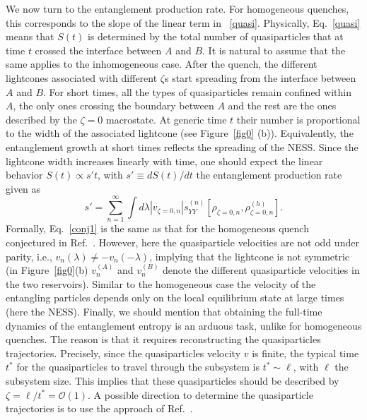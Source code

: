 \documentclass[twocolumn,superscriptaddress,prb,10pt]{revtex4-1}
\begin{document}
We now turn to the entanglement production rate. For homogeneous quenches, this corresponds to the 
slope of the linear term in ~\eqref{quasi}. Physically, Eq.~\eqref{quasi} means that $S(t)$ is determined by 
the total number of quasiparticles that at time $t$ crossed the interface between $A$ and $B$. 
It is natural to assume that the same applies  to the inhomogeneous case. 
After the quench, the different lightcones associated with different $\zeta$s  
start spreading from the interface between $A$ and $B$. For short times, all the 
types of quasiparticles remain confined within $A$, the only ones crossing the 
boundary between $A$ and the rest are the ones described by the $\zeta=0$ macrostate. 
At generic time $t$ their number is proportional to the width of the associated 
lightcone (see Figure~\ref{fig0} (b)). Equivalently, the entanglement 
growth at short times reflects the spreading of the NESS. 
Since the 
lightcone width increases linearly with time, one should expect the linear 
behavior $S(t)\propto s't$, with $s'\equiv dS(t)/dt$ the entanglement production rate given as  
%
\begin{equation}
\label{conj1}
s'=\sum_{n=1}^\infty\int d\lambda |v_{\zeta=0,n}|s_{YY}^{(n)}[\rho_{\zeta=0,n},
\rho_{\zeta=0,n}^{\scriptscriptstyle(h)}]. 
\end{equation}
%
Formally, Eq.~\eqref{conj1} is the same as that for the homogeneous quench conjectured in 
Ref.~. However, here the quasiparticle 
velocities are not odd under parity, i.e., $v_n(\lambda)\ne-v_n(-\lambda)$, implying that 
the lightcone is not symmetric (in Figure~\ref{fig0}(b) $v_n^{\scriptscriptstyle(A)}$ and 
$v_n^{\scriptscriptstyle (B)}$ denote the different quasiparticle velocities in the two reservoirs). 
Similar to the homogeneous case the velocity of the entangling particles depends only on the local 
equilibrium state at large times~\cite{alba-2016} (here the NESS). Finally, we should mention 
that obtaining the full-time dynamics of the entanglement entropy is an arduous task, unlike for 
homogeneous quenches. The reason is that it requires reconstructing the 
quasiparticles trajectories. Precisely, since the quasiparticles velocity $v$ is finite, 
the typical time $t^*$ for the quasiparticles to travel through the subsystem is 
$t^*\sim\ell$, with $\ell$ the subsystem size. This implies that these 
quasiparticles should be described by $\zeta=\ell/t^*={\mathcal O}(1)$. A possible 
direction to determine the quasiparticle trajectories is to use the approach of 
Ref.~. 
\end{document}
